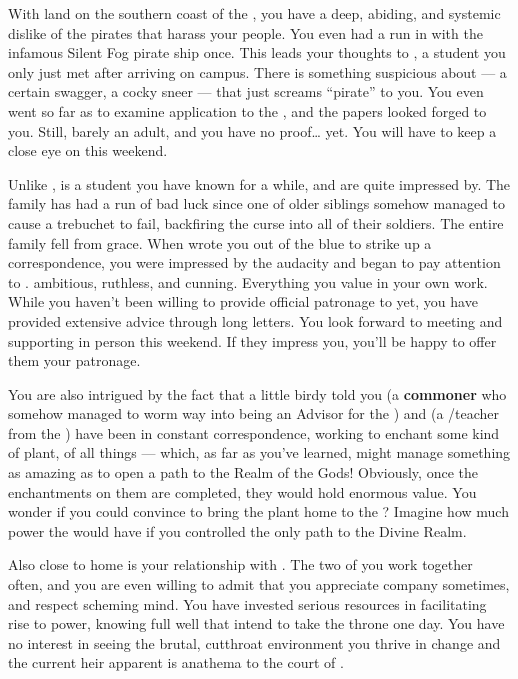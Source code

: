 \documentclass[char]{GL2020}
\begin{document}
With land on the southern coast of the \pFarm{}, you have a deep, abiding, and systemic dislike of the pirates that harass your people. You even had a run in with the infamous Silent Fog pirate ship once. This leads your thoughts to \cPirateChild{\full}, a student you only just met after arriving on campus. There is something suspicious about \cPirateChild{\them} — a certain swagger, a cocky sneer — that just screams ``pirate'' to you. You even went so far as to examine \cPirateChild{\their} application to the \pSc{}, and the papers looked forged to you. Still, \cPirateChild{\theyare} barely an adult, and you have no proof\ldots{} yet. You will have to keep a close eye on \cPirateChild{\them} this weekend.

Unlike \cPirateChild{}, \cLibAssist{} is a student you have known for a while, and are quite impressed by. The \cLibAssist{\formal} family has had a run of bad luck since one of \cLibAssist{\their} older siblings somehow managed to cause a trebuchet to fail, backfiring the curse into all of their soldiers. The entire family fell from grace. When \cLibAssist{} wrote you out of the blue to strike up a correspondence, you were impressed by the audacity and began to pay attention to \cLibAssist{\them}. \cLibAssist{\Theyare} ambitious, ruthless, and cunning. Everything you value in your own work. While you haven’t been willing to provide official patronage to \cLibAssist{} yet, you have provided extensive advice through long letters. You look forward to meeting and supporting \cLibAssist{\them} in person this weekend. If they impress you, you’ll be happy to offer them your patronage.

You are also intrigued by the fact that a little birdy told you \cCurse{\full} (a \textbf{commoner} who somehow managed to worm \cCurse{\their} way into being an Advisor for the \pFarm{}) and \cFlowPriest{\full} (a \cFlowPriest{\cleric}/teacher from the \pShip{}) have been in constant correspondence, working to enchant some kind of plant, of all things — which, as far as you've learned, might manage something as amazing as to open a path to the Realm of the Gods! Obviously, once the enchantments on them are completed, they would hold enormous value. You wonder if you could convince \cCurse{} to bring the plant home to the \pFarm{}? Imagine how much power the \pFarm{} would have if you controlled the only path to the Divine Realm. 

Also close to home is your relationship with \cPrince{\full}. The two of you work together often, and you are even willing to admit that you appreciate \cPrince{\their} company sometimes, and respect \cPrince{\their} scheming mind. You have invested serious resources in facilitating \cPrince{\their} rise to power, knowing full well that \cPrince{\they} intend\cPrince{\verbs} to take the throne one day. You have no interest in seeing the brutal, cutthroat environment you thrive in change and the current heir apparent is anathema to the court of \cQueen{\full}.  
\end{document}
